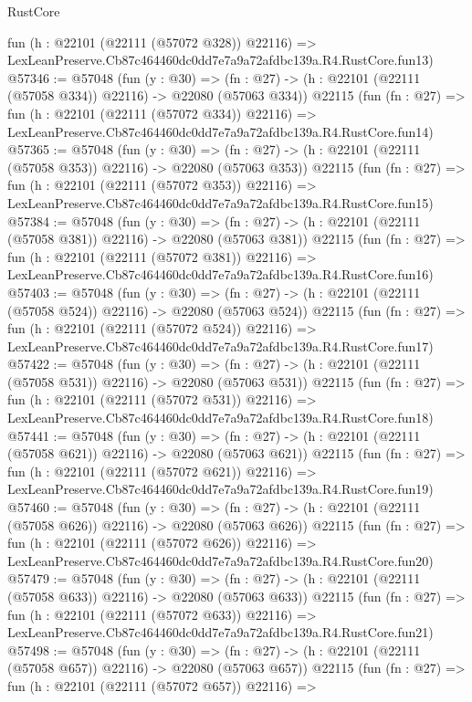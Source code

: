 \begin{lexlean}{RustCore}
\begin{coremodule}
    fun (h : @22101 (@22111 (@57072 @328)) @22116) =>
    LexLeanPreserve.Cb87c464460dc0dd7e7a9a72afdbc139a.R4.RustCore.fun13)
@57346 := @57048
    (fun (y : @30) =>
    (fn : @27) -> (h : @22101 (@22111 (@57058 @334)) @22116) -> @22080 (@57063 @334))
    @22115
    (fun (fn : @27) =>
    fun (h : @22101 (@22111 (@57072 @334)) @22116) =>
    LexLeanPreserve.Cb87c464460dc0dd7e7a9a72afdbc139a.R4.RustCore.fun14)
@57365 := @57048
    (fun (y : @30) =>
    (fn : @27) -> (h : @22101 (@22111 (@57058 @353)) @22116) -> @22080 (@57063 @353))
    @22115
    (fun (fn : @27) =>
    fun (h : @22101 (@22111 (@57072 @353)) @22116) =>
    LexLeanPreserve.Cb87c464460dc0dd7e7a9a72afdbc139a.R4.RustCore.fun15)
@57384 := @57048
    (fun (y : @30) =>
    (fn : @27) -> (h : @22101 (@22111 (@57058 @381)) @22116) -> @22080 (@57063 @381))
    @22115
    (fun (fn : @27) =>
    fun (h : @22101 (@22111 (@57072 @381)) @22116) =>
    LexLeanPreserve.Cb87c464460dc0dd7e7a9a72afdbc139a.R4.RustCore.fun16)
@57403 := @57048
    (fun (y : @30) =>
    (fn : @27) -> (h : @22101 (@22111 (@57058 @524)) @22116) -> @22080 (@57063 @524))
    @22115
    (fun (fn : @27) =>
    fun (h : @22101 (@22111 (@57072 @524)) @22116) =>
    LexLeanPreserve.Cb87c464460dc0dd7e7a9a72afdbc139a.R4.RustCore.fun17)
@57422 := @57048
    (fun (y : @30) =>
    (fn : @27) -> (h : @22101 (@22111 (@57058 @531)) @22116) -> @22080 (@57063 @531))
    @22115
    (fun (fn : @27) =>
    fun (h : @22101 (@22111 (@57072 @531)) @22116) =>
    LexLeanPreserve.Cb87c464460dc0dd7e7a9a72afdbc139a.R4.RustCore.fun18)
@57441 := @57048
    (fun (y : @30) =>
    (fn : @27) -> (h : @22101 (@22111 (@57058 @621)) @22116) -> @22080 (@57063 @621))
    @22115
    (fun (fn : @27) =>
    fun (h : @22101 (@22111 (@57072 @621)) @22116) =>
    LexLeanPreserve.Cb87c464460dc0dd7e7a9a72afdbc139a.R4.RustCore.fun19)
@57460 := @57048
    (fun (y : @30) =>
    (fn : @27) -> (h : @22101 (@22111 (@57058 @626)) @22116) -> @22080 (@57063 @626))
    @22115
    (fun (fn : @27) =>
    fun (h : @22101 (@22111 (@57072 @626)) @22116) =>
    LexLeanPreserve.Cb87c464460dc0dd7e7a9a72afdbc139a.R4.RustCore.fun20)
@57479 := @57048
    (fun (y : @30) =>
    (fn : @27) -> (h : @22101 (@22111 (@57058 @633)) @22116) -> @22080 (@57063 @633))
    @22115
    (fun (fn : @27) =>
    fun (h : @22101 (@22111 (@57072 @633)) @22116) =>
    LexLeanPreserve.Cb87c464460dc0dd7e7a9a72afdbc139a.R4.RustCore.fun21)
@57498 := @57048
    (fun (y : @30) =>
    (fn : @27) -> (h : @22101 (@22111 (@57058 @657)) @22116) -> @22080 (@57063 @657))
    @22115
    (fun (fn : @27) =>
    fun (h : @22101 (@22111 (@57072 @657)) @22116) =>

\end{coremodule}
\end{lexlean}

